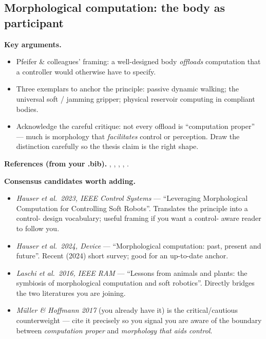 \subsection{Morphological computation: the body as participant}
\label{subsec:morph-comp}

\textbf{Key arguments.}
\begin{itemize}
    \item Pfeifer \& colleagues' framing: a well-designed body
          \emph{offloads} computation that a controller would
          otherwise have to specify.
    \item Three exemplars to anchor the principle: passive dynamic
          walking; the universal soft / jamming gripper; physical
          reservoir computing in compliant bodies.
    \item Acknowledge the careful critique: not every offload is
          ``computation proper'' --- much is morphology that
          \emph{facilitates} control or perception. Draw the
          distinction carefully so the thesis claim is the right
          shape.
\end{itemize}

\textbf{References (from your .bib).}
\cite{pfeiferHowBodyShapes2007},
\cite{pfeiferNewRoboticsDesign2005},
\cite{mullerWhatMorphologicalComputation2017},
\cite{wangEmbodyingPhysicalComputing2026},
\cite{aguilarReviewLocomotionRobophysics2016}.

\textbf{Consensus candidates worth adding.}
\begin{itemize}
    \item \emph{Hauser et al.\ 2023, IEEE Control Systems} ---
          ``Leveraging Morphological Computation for Controlling
          Soft Robots''. Translates the principle into a control-
          design vocabulary; useful framing if you want a control-
          aware reader to follow you.
    \item \emph{Hauser et al.\ 2024, Device} --- ``Morphological
          computation: past, present and future''. Recent (2024)
          short survey; good for an up-to-date anchor.
    \item \emph{Laschi et al.\ 2016, IEEE RAM} --- ``Lessons from
          animals and plants: the symbiosis of morphological
          computation and soft robotics''. Directly bridges the two
          literatures you are joining.
    \item \emph{Müller \& Hoffmann 2017} (you already have it) is the
          critical/cautious counterweight --- cite it precisely so
          you signal you are aware of the boundary between
          \emph{computation proper} and \emph{morphology that aids
          control}.
\end{itemize}

